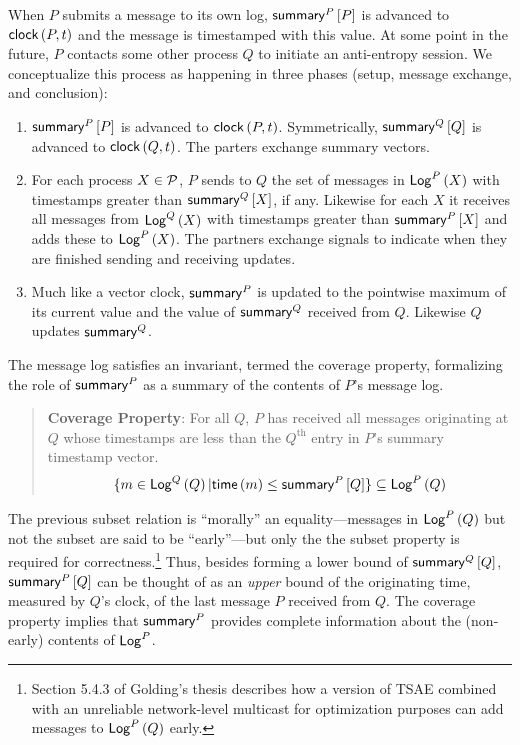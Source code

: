 \documentclass[]             %
{NASA}                       %
\theoremstyle{definition}
\begin{document}
When $P$ submits a message to its own log, $\mathsf{summary}^{P}\left[P\right]$ is
advanced to $\mathsf{clock}\left(P, t\right)$ and the message is timestamped with this
value. At some point in the future, $P$ contacts some other process
$Q$ to initiate an anti-entropy session. We conceptualize this process
as happening in three phases (setup, message exchange, and conclusion):
\begin{enumerate}
\item $\mathsf{summary}^{P}\left[P\right]$ is advanced to $\mathsf{clock}\left(P, t\right)$. Symmetrically,
  $\mathsf{summary}^{Q}\left[Q\right]$ is advanced to $\mathsf{clock}\left(Q, t\right)$. The parters exchange summary vectors.
\item For each process $X \in \mathcal{P}$, $P$ sends to $Q$ the set of
  messages in $\mathsf{Log}^{P}\left(X\right)$ with timestamps greater than
  $\mathsf{summary}^{Q}\left[X\right]$, if any. Likewise for each $X$ it receives all messages
  from $\mathsf{Log}^{Q}\left(X\right)$ with timestamps greater than $\mathsf{summary}^{P}\left[X\right]$ and
  adds these to $\mathsf{Log}^{P}\left(X\right)$. The partners exchange signals to indicate
  when they are finished sending and receiving updates.
\item Much like a vector clock, $\mathsf{summary}^{P}$ is updated to the
  pointwise maximum of its current value and the value of
  $\mathsf{summary}^{Q}$ received from $Q$. Likewise $Q$ updates
  $\mathsf{summary}^{Q}$.
\end{enumerate}
The message log satisfies an invariant, termed the coverage property,
formalizing the role of $\mathsf{summary}^{P}$ as a summary of the contents
of $P$'s message log.
\begin{quote}
  \textbf{Coverage Property}: For all $Q$, $P$ has received
  all messages originating at $Q$ whose timestamps are less than the
  $Q^\textrm{th}$ entry in $P$'s summary timestamp vector.
  \[ \{m \in \mathsf{Log}^{Q}\left(Q\right) | \mathsf{time}\left(m\right) \leq \mathsf{summary}^{P}\left[Q\right] \} \subseteq \mathsf{Log}^{P}\left(Q\right) \]
\end{quote}
The previous subset relation is ``morally'' an equality---messages in
$\mathsf{Log}^{P}\left(Q\right)$ but not the subset are said to be ``early''---but only the
the subset property is required for correctness.\footnote{Section
  5.4.3 of Golding's thesis describes how a version of TSAE
  combined with an unreliable network-level multicast for optimization purposes can add
  messages to $\mathsf{Log}^{P}\left(Q\right)$ early.} Thus, besides forming a lower
bound of $\mathsf{summary}^{Q}\left[Q\right]$, $\mathsf{summary}^{P}\left[Q\right]$ can be thought of as an
\emph{upper} bound of the originating time, measured by $Q$'s clock,
of the last message $P$ received from $Q$. The coverage property
implies that $\mathsf{summary}^{P}$ provides complete information about the
(non-early) contents of $\mathsf{Log}^{P}$.
\end{document}

